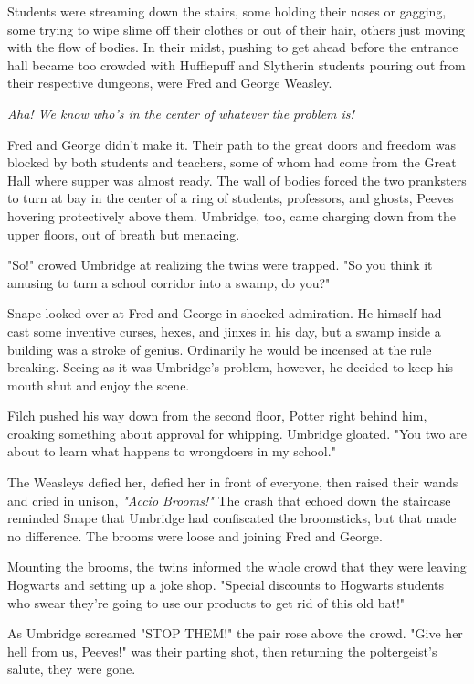 Students were streaming down the stairs, some holding their noses or gagging, some trying to wipe slime off their clothes or out of their hair, others just moving with the flow of bodies. In their midst, pushing to get ahead before the entrance hall became too crowded with Hufflepuff and Slytherin students pouring out from their respective dungeons, were Fred and George Weasley.

\emph{Aha! We know who's in the center of whatever the problem is!}

Fred and George didn't make it. Their path to the great doors and freedom was blocked by both students and teachers, some of whom had come from the Great Hall where supper was almost ready. The wall of bodies forced the two pranksters to turn at bay in the center of a ring of students, professors, and ghosts, Peeves hovering protectively above them. Umbridge, too, came charging down from the upper floors, out of breath but menacing.

"So!" crowed Umbridge at realizing the twins were trapped. "So{\el} you think it amusing to turn a school corridor into a swamp, do you?"

Snape looked over at Fred and George in shocked admiration. He himself had cast some inventive curses, hexes, and jinxes in his day, but a swamp inside a building was a stroke of genius. Ordinarily he would be incensed at the rule breaking. Seeing as it was Umbridge's problem, however, he decided to keep his mouth shut and enjoy the scene.

Filch pushed his way down from the second floor, Potter right behind him, croaking something about approval for whipping. Umbridge gloated. "You two are about to learn what happens to wrongdoers in my school."

The Weasleys defied her, defied her in front of everyone, then raised their wands and cried in unison, \emph{"Accio Brooms!"} The crash that echoed down the staircase reminded Snape that Umbridge had confiscated the broomsticks, but that made no difference. The brooms were loose and joining Fred and George.

Mounting the brooms, the twins informed the whole crowd that they were leaving Hogwarts and setting up a joke shop. "Special discounts to Hogwarts students who swear they're going to use our products to get rid of this old bat!"

As Umbridge screamed "STOP THEM!" the pair rose above the crowd. "Give her hell from us, Peeves!" was their parting shot, then returning the poltergeist's salute, they were gone.

